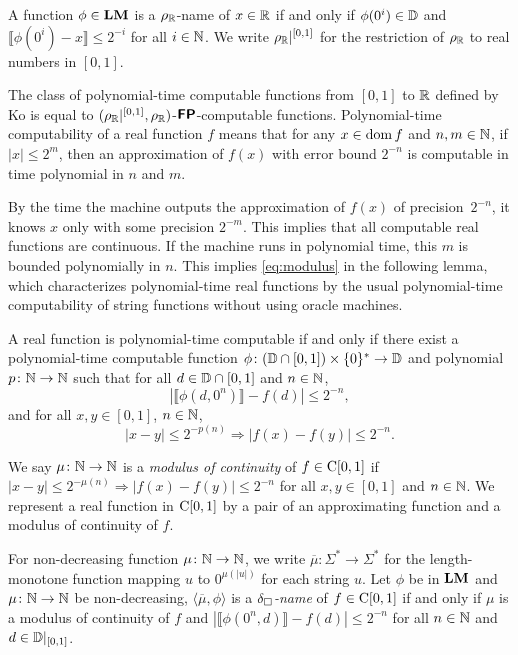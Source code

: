 \documentclass[envcountsame,orivec,oribibl]{llncs}
\begin{document}
A function $\phi \in \mathbf{LM}$ is a $\rho _\mathbb R$-name of $x \in \mathbb R$ 
if and only if $\phi(0^i) \in \mathbb D$ and $\llbracket \phi(0^i) - x \rrbracket \le 2^{-i}$
for all $i \in \mathbb N$.
We write $\rho _\mathbb R|^{[0,1]}$ for the restriction of $\rho _\mathbb R$ to real numbers in $[0,1]$.


The class of polynomial-time computable functions from $[0,1]$ to $\mathbb R$ 
defined by Ko is equal to
$(\rho _\mathbb R|^{[0,1]},\rho _\mathbb R)$-$\text{\bfseries \sffamily \upshape FP}$-computable functions.
Polynomial-time computability of a real function $f$ means that
for any $x \in \mathop{\rm dom} f$ and $n,m \in \mathbb N$, 
if $|x| \le 2^m$, then
an approximation of $f(x)$ with error bound $2^{-n}$
is computable in time polynomial in $n$ and $m$.

By the time the machine outputs the approximation of $f (x)$ of precision~$2 ^{-n}$, 
it knows $x$ only with some precision $2 ^{-m}$.
This implies that all computable real functions are continuous.
If the machine runs in polynomial time,
this $m$ is bounded polynomially in $n$.
This implies \eqref{eq:modulus} in the following lemma, 
which characterizes polynomial-time real functions
by the usual polynomial-time computability of string functions 
without using oracle machines. 

\begin{lemma}
 \label{lem:type1representation}
 A real function is polynomial-time computable if and only if
 there exist a polynomial-time computable function 
 $\phi \colon (\mathbb D \cap [0, 1]) \times \{0\} ^* \to \mathbb D$ and 
 polynomial $p \colon \mathbb N \to \mathbb N$ such that
 for all $d \in \mathbb D \cap [0,1]$ and $n \in \mathbb N$,
 \begin{equation}
  |\llbracket \phi(d, 0^n) \rrbracket - f(d)| \le 2^{-n},
 \end{equation}
 and for all $x, y \in [0, 1]$, $n \in \mathbb N$,
 \begin{equation} 
  |x-y| \le 2^{-p(n)} \Rightarrow |f(x) - f(y)| \le 2^{-n}.
   \label{eq:modulus}
 \end{equation}
\end{lemma}

We say $\mu \colon \mathbb N \to \mathbb N$ is a {\em modulus of continuity} of $f \in \mathrm C[0,1]$
if $|x - y| \le 2^{-\mu(n)} \Rightarrow |f(x) - f(y)| \le 2^{-n}$ for all $x, y \in [0,1]$ and $n \in \mathbb N$.
We represent a real function in $\mathrm C[0,1]$ by a pair of
an approximating function and a modulus of continuity of $f$.

For non-decreasing function $\mu \colon \mathbb N \to \mathbb N$, 
we write $\overline \mu \colon \Sigma^* \to \Sigma^*$ for the length-monotone
function mapping $u$ to $0^{\mu(|u|)}$ for each string $u$.
Let $\phi$ be in $\mathbf{LM}$ and $\mu \colon \mathbb N \to \mathbb N$ be non-decreasing,
$\langle \overline{\mu}, \phi \rangle$ is a {\em $\delta _\square$-name} of $f \in \mathrm C[0,1]$
if and only if $\mu$ is a modulus of continuity of $f$
and $|\llbracket \phi(0^n, d) \rrbracket - f(d)| \le 2^{-n}$ for all $n \in \mathbb N$ and $d \in \mathbb D|_{[0,1]}$.
\end{document}
